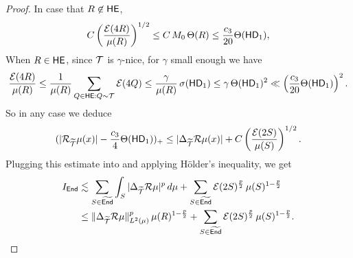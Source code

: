 \begin{proof}
In  case that $R\not\in{\mathsf {HE}}$,
\begin{equation}\label{eqEr4}
C\left(\frac{{\mathcal E}(4R)}{\mu(R)}\right)^{1/2} \leq C\,M_0\,\Theta(R)\leq \frac{c_3}{20} \Theta({\mathsf{HD}}_1),
\end{equation}
When $R\in{\mathsf {HE}}$, 
since ${\mathcal T}$ is $\gamma$-nice, for $\gamma$ small enough we have
\begin{equation}\label{eqEr5}
\frac{{\mathcal E}(4R)}{\mu(R)} \leq \frac1{\mu(R)}\sum_{Q\in{\mathsf {HE}}:Q\sim{\mathcal T}} {\mathcal E}(4Q)\leq\frac\gamma{\mu(R)} \,\sigma({\mathsf{HD}}_1)
\leq \gamma\,\Theta({\mathsf{HD}}_1)^2\ll \left(\frac{c_3}{20} \Theta({\mathsf{HD}}_1)\right)^2.
\end{equation}
So in any case we deduce
$$(|{\mathcal R}_{{\widetilde{{\mathcal T}}}}\mu(x)| - \frac{c_3}4 \Theta({\mathsf{HD}}_1))_+ \leq 
|\Delta_{{\widetilde{{\mathcal T}}}}{\mathcal R}\mu(x)| + C\left(\frac{{\mathcal E}(2S)}{\mu(S)}\right)^{1/2}.$$
Plugging this estimate into  and applying H\"older's inequality, we get
\begin{align}\label{eqIa99}
I_{\mathsf{End}} &\lesssim
\sum_{S\in{\widetilde{{\mathsf{End}}}}}\int_S |\Delta_{{\widetilde{{\mathcal T}}}}{\mathcal R}\mu|^{p}\,d\mu + \sum_{S\in{\widetilde{{\mathsf{End}}}}}{\mathcal E}(2S)^{\frac {p}2} \,\mu(S)^{1-\frac {p}2}\\
& \leq \|\Delta_{{\widetilde{{\mathcal T}}}}{\mathcal R}\mu\|_{L^2(\mu)}^{p}\,
\mu(R)^{1-\frac{p}2} + \sum_{S\in{\widetilde{{\mathsf{End}}}}}{\mathcal E}(2S)^{\frac {p}2} \,\mu(S)^{1-\frac {p}2}.\nonumber
\end{align}


\end{proof}
